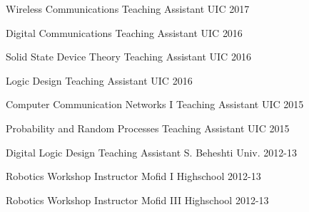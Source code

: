 

\begin{cvhonors}

  \cvhonor
    {Wireless Communications} %
    {Teaching Assistant} %
    {UIC} %
    {2017} %
    
  \cvhonor
    {Digital Communications} %
    {Teaching Assistant} %
    {UIC} %
    {2016} %


  \cvhonor
    {Solid State Device Theory} %
    {Teaching Assistant} %
    {UIC} %
    {2016} %




  \cvhonor
    {Logic Design} %
    {Teaching Assistant} %
    {UIC} %
    {2016} %



  \cvhonor
    {Computer Communication Networks I} %
    {Teaching Assistant} %
    {UIC} %
    {2015} %



  \cvhonor
    {Probability and Random Processes} %
    {Teaching Assistant} %
    {UIC} %
    {2015} %


  \cvhonor
    {Digital Logic Design} %
    {Teaching Assistant} %
    {S. Beheshti Univ.} %
    {2012-13} %


  \cvhonor
    {Robotics Workshop} %
    {Instructor} %
    {Mofid I Highschool} %
    {2012-13} %

  \cvhonor
    {Robotics Workshop} %
    {Instructor} %
    {Mofid III Highschool} %
    {2012-13} %


\end{cvhonors}
